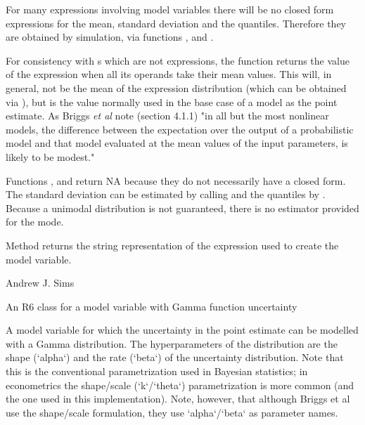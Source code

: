 \documentclass[a4paper]{book}
\begin{document}
\begin{Note}\relax
For many expressions involving model variables there will 
be no closed form expressions for the mean, standard deviation and
the quantiles. Therefore they are obtained by simulation, via
functions ,  and .

For consistency with s which are not expressions, the
function  returns the value of the expression when all
its operands take their mean values. This will, in general, not
be the mean of the expression distribution (which can be obtained
via ), but is the value normally used in the base
case of a model as the point estimate. As Briggs \emph{et al} note 
(section 4.1.1) "in all but the most nonlinear models, the 
difference between the expectation over the output of a 
probabilistic model and that model evaluated at the mean values
of the input parameters, is likely to be modest."

Functions ,  and  return NA
because they do not necessarily have a closed form. The standard
deviation can be estimated by calling  and the
quantiles by . Because a unimodal distribution is not
guaranteed, there is no estimator provided for the mode.

Method  returns the string representation 
of the expression used to create the model variable.
\end{Note}
%
\begin{Author}\relax
Andrew J. Sims 
\end{Author}
%
\begin{Description}\relax
An R6 class for a model variable with Gamma function uncertainty
\end{Description}
%
\begin{Details}\relax
A model variable for which the uncertainty in the point estimate can
be modelled with a Gamma distribution. The hyperparameters of the
distribution are the shape (`alpha`) and the rate (`beta`) of
the uncertainty distribution. Note that this is the conventional
parametrization used in Bayesian statistics; in econometrics the
shape/scale (`k`/`theta`) parametrization is more common (and the one
used in this implementation). Note, however, that although Briggs et al
use the shape/scale formulation, they use `alpha`/`beta` as parameter
names.
\end{Details}
\end{document}
